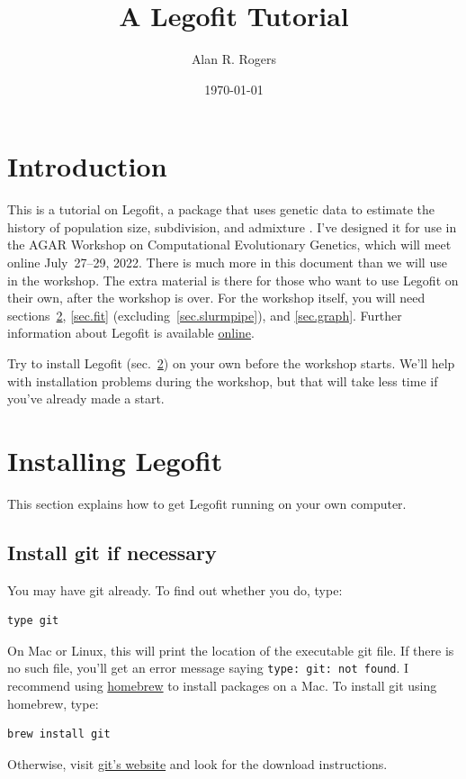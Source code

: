 \documentclass[11pt]{article}
\begin{document}
\title{A Legofit Tutorial}
\author{Alan R. Rogers}
\date{\today}
\maketitle
\tableofcontents

\section{Introduction}
This is a tutorial on Legofit, a package that uses genetic data to
estimate the history of population size, subdivision, and admixture
\citep{Rogers:BMC-20-526, Rogers:PCJ-2-e32}. I've designed it for use
in the AGAR Workshop on Computational Evolutionary Genetics, which
will meet online July~27--29, 2022. There is much more in this
document than we will use in the workshop. The extra material is there
for those who want to use Legofit on their own, after the workshop is
over. For the workshop itself, you will need
sections~\ref{sec.install}, \ref{sec.fit}
(excluding~\ref{sec.slurmpipe}), and \ref{sec.graph}.  Further
information about Legofit is available
\href{http://alanrogers.github.io/legofit/html/index.html}{online}.

Try to install Legofit (sec.~\ref{sec.install}) on your own before the
workshop starts. We'll help with installation problems during the
workshop, but that will take less time if you've already made a start.

\section{Installing Legofit}
\label{sec.install}
This section explains how to get Legofit running on your own
computer.

\subsection{Install git if necessary}
You may have git already. To find out whether you do, type:
\begin{verbatim}
type git
\end{verbatim}
On Mac or Linux, this will print the location of the executable git
file. If there is no such file, you'll get an error message saying
\verb|type: git: not found|. I recommend using
\href{https://brew.sh}{homebrew} to install packages on a Mac. To
install git using homebrew, type:
\begin{verbatim}
brew install git
\end{verbatim}
Otherwise, visit \href{https://git-scm.com}{git's website} and look
for the download instructions.
\end{document}
